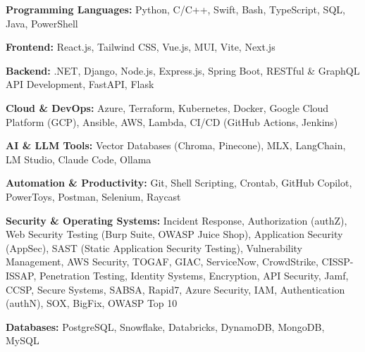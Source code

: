 \textbf{Programming Languages:} Python, C/C++, Swift, Bash, TypeScript, SQL, Java, PowerShell
\vspace{3pt}

\textbf{Frontend:} React.js, Tailwind CSS, Vue.js, MUI, Vite, Next.js
\vspace{3pt}

\textbf{Backend:} .NET, Django, Node.js, Express.js, Spring Boot, RESTful \& GraphQL API Development, FastAPI, Flask
\vspace{3pt}

\textbf{Cloud \& DevOps:} Azure, Terraform, Kubernetes, Docker, Google Cloud Platform (GCP), Ansible, AWS, Lambda, CI/CD (GitHub Actions, Jenkins)
\vspace{3pt}

\textbf{AI \& LLM Tools:} Vector Databases (Chroma, Pinecone), MLX, LangChain, LM Studio, Claude Code, Ollama
\vspace{3pt}

\textbf{Automation \& Productivity:} Git, Shell Scripting, Crontab, GitHub Copilot, PowerToys, Postman, Selenium, Raycast
\vspace{3pt}

\textbf{Security \& Operating Systems:} Incident Response, Authorization (authZ), Web Security Testing (Burp Suite, OWASP Juice Shop), Application Security (AppSec), SAST (Static Application Security Testing), Vulnerability Management, AWS Security, TOGAF, GIAC, ServiceNow, CrowdStrike, CISSP-ISSAP, Penetration Testing, Identity Systems, Encryption, API Security, Jamf, CCSP, Secure Systems, SABSA, Rapid7, Azure Security, IAM, Authentication (authN), SOX, BigFix, OWASP Top 10
\vspace{3pt}

\textbf{Databases:} PostgreSQL, Snowflake, Databricks, DynamoDB, MongoDB, MySQL